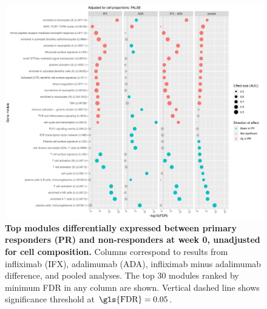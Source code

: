 \begin{figure}
    \centering
    \includegraphics[width=1.0\textwidth,page=1]{mainmatter/figures/chapter_04/plot_gene_set_enrichment.tmodCERNO_panelplot_reversed_C_1RI_1NI,C_1RA_1NA,C_(1RI_1NI)_(1RA_1NA),C_1R_1N.cell_prop_correction_FALSE.pdf}
    \caption[
    ]{
        \textbf{Top modules differentially expressed between primary responders (PR) and non-responders at week 0, unadjusted for cell composition.}
        Columns correspond to results from infliximab (IFX), adalimumab (ADA), infliximab minus adalimumab difference, and pooled analyses. 
        The top 30 modules ranked by minimum \gls{FDR} in any column are shown. Vertical dashed line shows significance threshold at $\text{\gls{FDR}} = 0.05$.
    }
    \label{fig:multipants_dge_panelPlot_week_0_R_N_cellPropF}
\end{figure}

